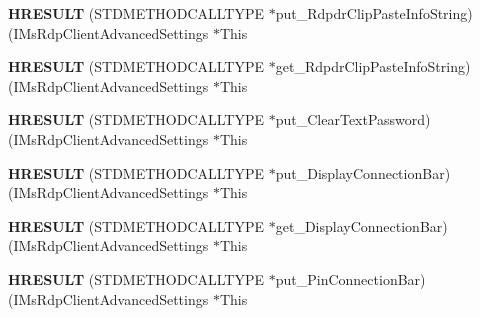 \begin{DoxyCompactItemize}
\item 
\mbox{\label{struct_i_ms_rdp_client_advanced_settings_vtbl_ad56169d5af4654ed1944ad02d1a39456}} 
{\bfseries H\+R\+E\+S\+U\+LT} (S\+T\+D\+M\+E\+T\+H\+O\+D\+C\+A\+L\+L\+T\+Y\+PE $\ast$put\+\_\+\+Rdpdr\+Clip\+Paste\+Info\+String)(I\+Ms\+Rdp\+Client\+Advanced\+Settings $\ast$This
\item 
\mbox{\label{struct_i_ms_rdp_client_advanced_settings_vtbl_ad603dc70cbf192561471f76d8133fc0a}} 
{\bfseries H\+R\+E\+S\+U\+LT} (S\+T\+D\+M\+E\+T\+H\+O\+D\+C\+A\+L\+L\+T\+Y\+PE $\ast$get\+\_\+\+Rdpdr\+Clip\+Paste\+Info\+String)(I\+Ms\+Rdp\+Client\+Advanced\+Settings $\ast$This
\item 
\mbox{\label{struct_i_ms_rdp_client_advanced_settings_vtbl_a73448fe4ba22e551e20aa87866099762}} 
{\bfseries H\+R\+E\+S\+U\+LT} (S\+T\+D\+M\+E\+T\+H\+O\+D\+C\+A\+L\+L\+T\+Y\+PE $\ast$put\+\_\+\+Clear\+Text\+Password)(I\+Ms\+Rdp\+Client\+Advanced\+Settings $\ast$This
\item 
\mbox{\label{struct_i_ms_rdp_client_advanced_settings_vtbl_acf93ab77b6a44ccc722f006d75a31611}} 
{\bfseries H\+R\+E\+S\+U\+LT} (S\+T\+D\+M\+E\+T\+H\+O\+D\+C\+A\+L\+L\+T\+Y\+PE $\ast$put\+\_\+\+Display\+Connection\+Bar)(I\+Ms\+Rdp\+Client\+Advanced\+Settings $\ast$This
\item 
\mbox{\label{struct_i_ms_rdp_client_advanced_settings_vtbl_a48ce0f8851804204d2f2d8acf3942cbc}} 
{\bfseries H\+R\+E\+S\+U\+LT} (S\+T\+D\+M\+E\+T\+H\+O\+D\+C\+A\+L\+L\+T\+Y\+PE $\ast$get\+\_\+\+Display\+Connection\+Bar)(I\+Ms\+Rdp\+Client\+Advanced\+Settings $\ast$This
\item 
\mbox{\label{struct_i_ms_rdp_client_advanced_settings_vtbl_a261aab47ce69cc577c72ccc8627380a7}} 
{\bfseries H\+R\+E\+S\+U\+LT} (S\+T\+D\+M\+E\+T\+H\+O\+D\+C\+A\+L\+L\+T\+Y\+PE $\ast$put\+\_\+\+Pin\+Connection\+Bar)(I\+Ms\+Rdp\+Client\+Advanced\+Settings $\ast$This
\item 
\mbox{\label{struct_i_ms_rdp_client_advanced_settings_vtbl_abadf91a6b9b6559e3ed10480123237b1}} 

\end{DoxyCompactItemize}
